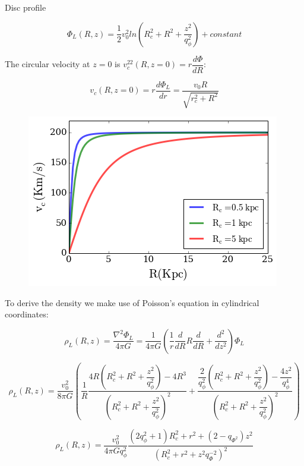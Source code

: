 \documentclass[a4paper, 12pt]{article} %
\begin{document}
Disc profile

\begin{equation}
\Phi_L(R, z) = \dfrac{1}{2} v_0^2 ln \left( R_c^2 + R^2 + \dfrac{z^2}{q_{\phi}^2}  \right) + constant
\end{equation}

The circular velocity at $z=0$ is $v_c^22(R, z=0) = r \dfrac{d \Phi}{dR}$:

\begin{equation}
v_c(R, z=0) = r \dfrac{d \Phi_L}{dr} = \dfrac{v_0 R}{\sqrt{r_c^2 + R^2}}
\end{equation}

\begin{figure}[H]
\centering
\includegraphics[scale=0.7]{Log_vc.png}
\end{figure}


To derive the density we make use of Poisson's equation in cylindrical coordinates:

\begin{equation}
\rho_L(R, z) = \dfrac{\nabla^2 \Phi_L}{4 \pi G } = \dfrac{1}{4 \pi G} \left( \dfrac{1}{r}\dfrac{d}{dR}R\dfrac{d}{dR}  + \dfrac{d^2}{dz^2}  \right) \Phi_L
\end{equation}

\begin{equation}
\rho_L(R, z) = \dfrac{v_0^2}{8 \pi G } \left( \dfrac{1}{R} \dfrac{4R ( R_c^2 + R^2 + \dfrac{z^2}{q_{\phi}^2} ) - 4R^3}{( R_c^2 + R^2 + \dfrac{z^2}{q_{\phi}^2} )^2} + \dfrac{\dfrac{2}{q_{\phi}^2} ( R_c^2 + R^2 + \dfrac{z^2}{q_{\phi}^2} ) - \dfrac{4z^2}{q_{\phi}^4}}{( R_c^2 + R^2 + \dfrac{z^2}{q_{\phi}^2} )^2}  \right)
\end{equation}

\begin{equation}
\rho_L(R, z) =  \dfrac{v_0^2}{4 \pi G q_{\phi}^2} \dfrac{(2q_{\phi}^2 + 1)R_c^2 + r^2 + (2 - q_{\Phi^2})z^2}{(R_c^2 + r^2 + z^2q_{\Phi}^{-2})^2}
\end{equation}
\end{document}
